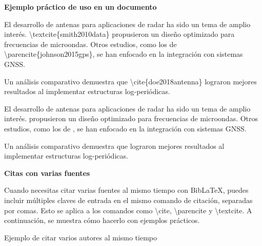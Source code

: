 \textbf{Ejemplo práctico de uso en un documento}

El desarrollo de antenas para aplicaciones de radar ha sido un tema de amplio interés. \textbackslash textcite\{smith2010data\} propusieron un diseño optimizado para frecuencias de microondas. Otros estudios, como los de \textbackslash parencite\{johnson2015gps\}, se han enfocado en la integración con sistemas GNSS.

Un análisis comparativo demuestra que \textbackslash cite\{doe2018antenna\} lograron mejores resultados al implementar estructuras log-periódicas.


El desarrollo de antenas para aplicaciones de radar ha sido un tema de amplio interés. \textcite{smith2010data} propusieron un diseño optimizado para frecuencias de microondas. Otros estudios, como los de \parencite{johnson2015gps}, se han enfocado en la integración con sistemas GNSS.

Un análisis comparativo demuestra que \cite{doe2018antenna} lograron mejores resultados al implementar estructuras log-periódicas.

\textbf{Citas con varias fuentes}

Cuando necesitas citar varias fuentes al mismo tiempo con BibLaTeX, puedes incluir múltiples claves de entrada en el mismo comando de citación, separadas por comas. Esto se aplica a los comandos como \textbackslash cite, \textbackslash parencite y \textbackslash textcite. A continuación, se muestra cómo hacerlo con ejemplos prácticos.

Ejemplo de citar varios autores al mismo tiempo

